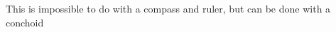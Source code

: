 \documentclass[preview]{standalone}
\begin{document}
\begin{center}
This is impossible to do with a compass and ruler, but can be done with a conchoid
\end{center}
\end{document}
